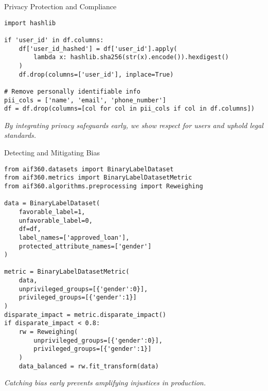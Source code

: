 \documentclass[aspectratio=169]{beamer}
\begin{document}
%
%
\begin{frame}{Privacy Protection and Compliance}
\begin{verbatim}
import hashlib

if 'user_id' in df.columns:
    df['user_id_hashed'] = df['user_id'].apply(
        lambda x: hashlib.sha256(str(x).encode()).hexdigest()
    )
    df.drop(columns=['user_id'], inplace=True)

# Remove personally identifiable info
pii_cols = ['name', 'email', 'phone_number']
df = df.drop(columns=[col for col in pii_cols if col in df.columns])
\end{verbatim}

\emph{By integrating privacy safeguards early, we show respect for users and uphold legal standards.}
\end{frame}

%
\begin{frame}{Detecting and Mitigating Bias}
\begin{verbatim}
from aif360.datasets import BinaryLabelDataset
from aif360.metrics import BinaryLabelDatasetMetric
from aif360.algorithms.preprocessing import Reweighing

data = BinaryLabelDataset(
    favorable_label=1,
    unfavorable_label=0,
    df=df,
    label_names=['approved_loan'],
    protected_attribute_names=['gender']
)

metric = BinaryLabelDatasetMetric(
    data,
    unprivileged_groups=[{'gender':0}],
    privileged_groups=[{'gender':1}]
)
disparate_impact = metric.disparate_impact()
if disparate_impact < 0.8:
    rw = Reweighing(
        unprivileged_groups=[{'gender':0}],
        privileged_groups=[{'gender':1}]
    )
    data_balanced = rw.fit_transform(data)
\end{verbatim}

\emph{Catching bias early prevents amplifying injustices in production.}
\end{frame}
\end{document}

